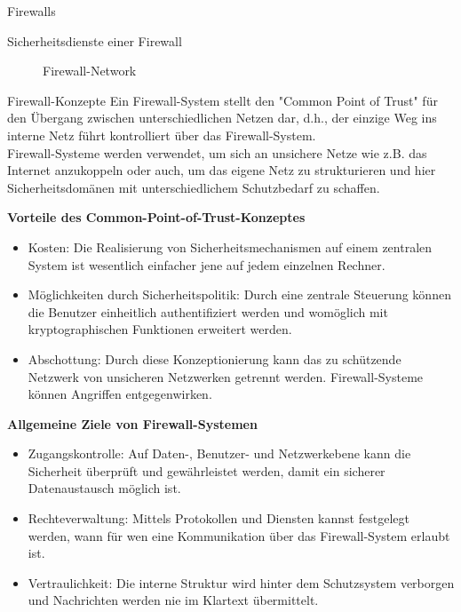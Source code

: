 \begin{section}{Firewalls}
\begin{subsection}{Sicherheitsdienste einer Firewall}
\begin{figure}[htbp]
{{    		%
  		}\DIFaddendFL }
		\caption[Firewall:Network]{Firewall-Network}
		\label{Firewall_Network}
	\end{figure}
  \end{subsection}
  \pagebreak

  \label{Firewall-Konzepte}
  \begin{subsection}{Firewall-Konzepte}
  	Ein Firewall-System stellt den "Common Point of Trust" für den Übergang zwischen 
  	unterschiedlichen Netzen dar, d.h., der einzige Weg ins interne Netz führt kontrolliert über das Firewall-System.
  	\\
  	Firewall-Systeme werden verwendet, um sich an unsichere Netze wie z.B. das Internet anzukoppeln 
  	oder auch, um das eigene Netz zu strukturieren und hier 
  	Sicherheitsdomänen mit unterschiedlichem Schutzbedarf zu schaffen.

  	\textbf{Vorteile des Common-Point-of-Trust-Konzeptes}
  	\begin{itemize}
  		\item Kosten:
  			Die Realisierung von Sicherheitsmechanismen auf einem zentralen System ist wesentlich einfacher jene 
  			auf jedem einzelnen Rechner.
  		\item Möglichkeiten durch Sicherheitspolitik:
  			Durch eine zentrale Steuerung können die Benutzer einheitlich authentifiziert werden und womöglich 
  			mit kryptographischen Funktionen erweitert werden.
  		\item Abschottung:
  			Durch diese Konzeptionierung kann das zu schützende Netzwerk von unsicheren Netzwerken getrennt werden.
  			Firewall-Systeme können Angriffen entgegenwirken.
  	\end{itemize}

  	\textbf{Allgemeine Ziele von Firewall-Systemen}
  	\begin{itemize}
  		\item Zugangskontrolle:
  			Auf Daten-, Benutzer- und Netzwerkebene kann die Sicherheit überprüft und gewährleistet werden, 
  			damit ein sicherer Datenaustausch möglich ist.
  		\item Rechteverwaltung:
  			Mittels Protokollen und Diensten kannst festgelegt werden, wann für wen eine Kommunikation über das 
  			Firewall-System erlaubt ist.
  		\item Vertraulichkeit:
  			Die interne Struktur wird hinter dem Schutzsystem verborgen und Nachrichten werden nie im Klartext 
  			übermittelt.
  	\end{itemize}
  \end{subsection}
 \end{section}
\pagebreak
